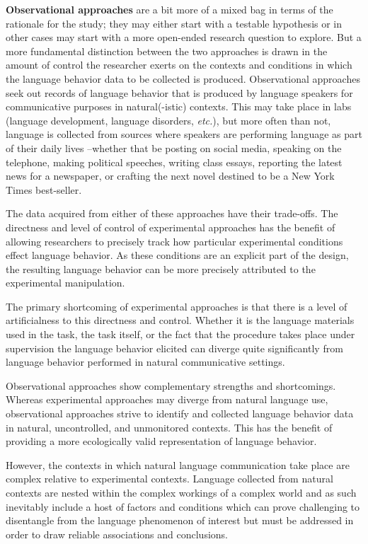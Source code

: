 \documentclass[
  letterpaper,
]{latex/krantz}
\theoremstyle{definition}
\theoremstyle{remark}
\begin{document}
\textbf{Observational approaches} are a bit more of a mixed bag in terms
of the rationale for the study; they may either start with a testable
hypothesis or in other cases may start with a more open-ended research
question to explore. But a more fundamental distinction between the two
approaches is drawn in the amount of control the researcher exerts on
the contexts and conditions in which the language behavior data to be
collected is produced. Observational approaches seek out records of
language behavior that is produced by language speakers for
communicative purposes in natural(-istic) contexts. This may take place
in labs (language development, language disorders, \emph{etc.}), but
more often than not, language is collected from sources where speakers
are performing language as part of their daily lives --whether that be
posting on social media, speaking on the telephone, making political
speeches, writing class essays, reporting the latest news for a
newspaper, or crafting the next novel destined to be a New York Times
best-seller.

The data acquired from either of these approaches have their trade-offs.
The directness and level of control of experimental approaches has the
benefit of allowing researchers to precisely track how particular
experimental conditions effect language behavior. As these conditions
are an explicit part of the design, the resulting language behavior can
be more precisely attributed to the experimental manipulation.

The primary shortcoming of experimental approaches is that there is a
level of artificialness to this directness and control. Whether it is
the language materials used in the task, the task itself, or the fact
that the procedure takes place under supervision the language behavior
elicited can diverge quite significantly from language behavior
performed in natural communicative settings.

Observational approaches show complementary strengths and shortcomings.
Whereas experimental approaches may diverge from natural language use,
observational approaches strive to identify and collected language
behavior data in natural, uncontrolled, and unmonitored contexts. This
has the benefit of providing a more ecologically valid representation of
language behavior.

However, the contexts in which natural language communication take place
are complex relative to experimental contexts. Language collected from
natural contexts are nested within the complex workings of a complex
world and as such inevitably include a host of factors and conditions
which can prove challenging to disentangle from the language phenomenon
of interest but must be addressed in order to draw reliable associations
and conclusions.
\end{document}

